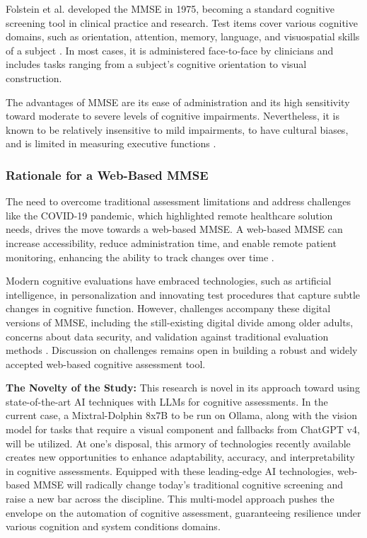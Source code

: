 Folstein et al. developed the MMSE in 1975, becoming a standard cognitive screening tool in clinical practice and research. Test items cover various cognitive domains, such as orientation, attention, memory, language, and visuospatial skills of a subject \cite{Folstein1975, Tombaugh1992, Shulman2006}. In most cases, it is administered face-to-face by clinicians and includes tasks ranging from a subject's cognitive orientation to visual construction.

The advantages of MMSE are its ease of administration and its high sensitivity toward moderate to severe levels of cognitive impairments. Nevertheless, it is known to be relatively insensitive to mild impairments, to have cultural biases, and is limited in measuring executive functions \cite{Folstein1975}.

\subsubsection{Rationale for a Web-Based MMSE}

The need to overcome traditional assessment limitations and address challenges like the COVID-19 pandemic, which highlighted remote healthcare solution needs, drives the move towards a web-based MMSE. A web-based MMSE can increase accessibility, reduce administration time, and enable remote patient monitoring, enhancing the ability to track changes over time \cite{Bauer2012, Seifan2015, Zygouris2017, Geddes2020, Cullum2014, Lim2020, Harrington2021}.

Modern cognitive evaluations have embraced technologies, such as artificial intelligence, in personalization and innovating test procedures that capture subtle changes in cognitive function. However, challenges accompany these digital versions of MMSE, including the still-existing digital divide among older adults, concerns about data security, and validation against traditional evaluation methods \cite{Bilder2020, Wild2021}. Discussion on challenges remains open in building a robust and widely accepted web-based cognitive assessment tool.

\textbf{The Novelty of the Study:} This research is novel in its approach toward using state-of-the-art AI techniques with LLMs for cognitive assessments. In the current case, a Mixtral-Dolphin 8x7B to be run on Ollama, along with the vision model for tasks that require a visual component and fallbacks from ChatGPT v4, will be utilized. At one's disposal, this armory of technologies recently available creates new opportunities to enhance adaptability, accuracy, and interpretability in cognitive assessments. Equipped with these leading-edge AI technologies, web-based MMSE will radically change today's traditional cognitive screening and raise a new bar across the discipline. This multi-model approach pushes the envelope on the automation of cognitive assessment, guaranteeing resilience under various cognition and system conditions domains.

